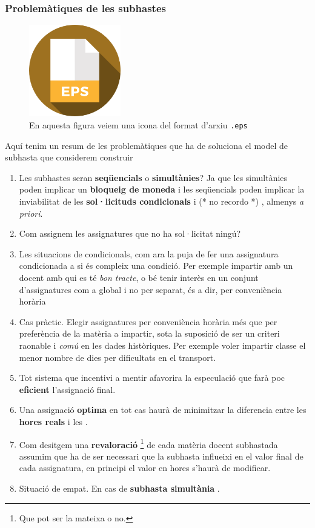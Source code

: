 \documentclass[10pt,twocolumn]{article}
\newcommand{\nehh}[1]{\color{magenta} (* {#1} *) \normalcolor }
\begin{document}
\subsubsection{Problemàtiques de les  subhastes}
\begin{figure}
	\centering
	\includegraphics[width=4cm]{eps}
	\caption{En aquesta figura veiem una icona del format d'arxiu \texttt{.eps}}
	\label{fig:3}
\end{figure}
Aquí tenim un resum de les problemàtiques que ha de soluciona el model de subhasta que considerem construir 
\begin{tcolorbox}[colback=black!1,title=\textbf{Llista problemàtiques subhastes},coltitle=black,colbacktitle=black!10]
\begin{enumerate}
	\item Les subhastes seran \textbf{seqüencials} o \textbf{simultànies}? Ja que les simultànies  poden implicar un \textbf{bloqueig de moneda} i les seqüencials poden implicar la inviabilitat de les \textbf{sol·licituds condicionals} i \nehh{no recordo}, almenys \textit{ a priori}.
	\item Com assignem les assignatures que no ha sol·licitat ningú?
	\item Les situacions de condicionals, com ara la puja de fer una assignatura condicionada a si  és compleix una condició.{\color{gray} Per exemple impartir amb un docent amb qui es té  \textit{bon tracte}, o bé tenir interès en un conjunt d'assignatures com a global i no per separat, és a dir, per conveniència horària} 
	\item Cas pràctic. Elegir assignatures per conveniència horària més  que per preferència de la matèria a impartir, sota la suposició de ser un criteri raonable i \textit{comú} en les dades històriques. {\color{gray} Per exemple voler impartir classe el menor nombre de dies per dificultats en el transport.}  
	\item Tot sistema que incentivi a mentir afavorira la especulació que farà poc \textbf{eficient} l'assignació final.
	\item Una assignació \textbf{optima} en tot cas haurà de  minimitzar la diferencia entre les \textbf{hores reals} i les .
	\item Com desitgem una \textbf{revaloració} \footnote{Que pot ser la mateixa o no.} de cada matèria docent subhastada assumim que ha de ser necessari que la subhasta influeixi en el valor final de cada assignatura, en principi el valor en hores s'haurà de modificar.
	\item Situació de empat. {\color{gray} En cas de \textbf{subhasta simultània} .}
\end{enumerate}
\end{tcolorbox}
\end{document}
